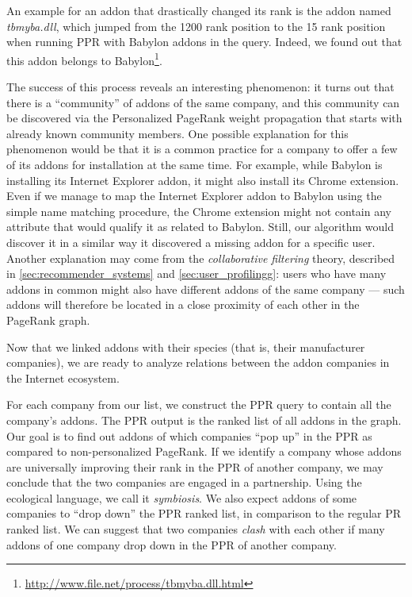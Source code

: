\documentclass[ijoc,nonblindrev]{informs3} %
\numberwithin{equation}{subsection}
\begin{document}
An example for an addon that drastically changed its rank is the addon named \emph{tbmyba.dll}, which jumped from the 1200 rank position to the 15 rank position when running PPR with Babylon addons in the query. Indeed, we found out that this addon belongs to Babylon\footnote{\url{http://www.file.net/process/tbmyba.dll.html}}.

The success of this process reveals an interesting phenomenon: it turns out that there is a ``community'' of addons of the same company, and this community can be discovered via the Personalized PageRank weight propagation that starts with already known community members. One possible explanation for this phenomenon would be that it is a common practice for a company to offer a few of its addons for installation at the same time. For example, while Babylon is installing its Internet Explorer addon, it might also install its Chrome extension. Even if we manage to map the Internet Explorer addon to Babylon using the simple name matching procedure, the Chrome extension might not contain any attribute that would qualify it as related to Babylon. Still, our algorithm would discover it in a similar way it discovered a missing addon for a specific user. 
Another explanation may come from the \emph{collaborative filtering} theory, described in \autoref{sec:recommender_systems} and \autoref{sec:user_profilingg}: users who have many addons in common might also have different addons of the same company --- such addons will therefore be located in a close proximity of each other in the PageRank graph.

Now that we linked addons with their species (that is, their manufacturer companies), we are ready to analyze relations between the addon companies in the Internet ecosystem. 

For each company from our list, we construct the PPR query to contain all the company's addons. The PPR output is the ranked list of all addons in the graph. Our goal is to find out addons of which companies ``pop up'' in the PPR as compared to non-personalized PageRank. If we identify a company whose addons are universally improving their rank in the PPR of another company, we may conclude that the two companies are engaged in a partnership. Using the ecological language, we call it \emph{symbiosis}. We also expect addons of some companies to ``drop down'' the PPR ranked list, in comparison to the regular PR ranked list. We can suggest that two companies \emph{clash} with each other if many addons of one company drop down in the PPR of another company.
\end{document}
